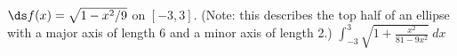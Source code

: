 {$\ds f(x) = \sqrt{1-x^2/9}$ on $[-3, 3]$. (Note: this describes the top half of an ellipse with a major axis of length 6 and a minor axis of length 2.)}
{$\int_{-3}^3 \sqrt{1+\frac{x^2}{81-9x^2}}\ dx$}
